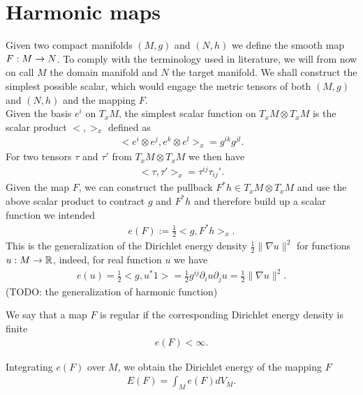 \section{Harmonic maps}
\label{sec:preliminaries}

Given two compact manifolds $(M,g)$ and $(N,h)$ we define the smooth
map $F:M\rightarrow N$. To comply with the terminology used in literature, we
will from now on call $M$ the domain manifold and $N$ the target
manifold. We shall construct the simplest possible scalar,
which would engage the metric tensors of both $(M,g)$ and $(N,h)$ and the mapping $F$.\\
Given the basis $e^i$ on $T_x M$, the simplest scalar function on $T_x
M\otimes T_x M$ is the scalar product $<,>_x$ defined as
\begin{align}
  \label{eq:1}
  <e^i\otimes e^j,e^k\otimes e^l>_x=g^{ik}g^{jl}.
\end{align}
For two tensors $\tau$ and $\tau'$ from $T_x M\otimes T_x M$ we then
have
\begin{align}
  \label{eq:2}
  <\tau,\tau'>_x=\tau^{ij}\tau_{ij}'.
\end{align}
Given the map $F$, we can construct the pullback $F^*h\in T_x M\otimes
T_x M$ and use the above scalar product to contract $g$ and $F^* h$
and therefore build up a scalar function we intended
\begin{align}
  \label{eq:3}
  e(F):=\frac{1}{2}<g,F^*h>_x.
\end{align}
This is the generalization of the Dirichlet energy density
$\frac{1}{2}\lVert\nabla u\rVert^2$ for functions $u:M\rightarrow\mathbb{R}$,
indeed, for real function $u$ we have
\begin{align}
  \label{eq:4}
  e(u)=\frac{1}{2}<g,u^*1>=\frac{1}{2}g^{ij}\partial_i u\partial_j u
  =\frac{1}{2}\lVert\nabla u\rVert^2.
\end{align}
(TODO: the generalization of harmonic function)
\begin{definition}\label{def:regular-map}
  We say that a map $F$ is regular if the corresponding Dirichlet
  energy density is finite
  \begin{align}
    \label{eq:5}
    e(F)<\infty.
  \end{align}
\end{definition}

Integrating $e(F)$ over $M$, we obtain the Dirichlet energy of the
mapping $F$
\begin{align}\label{eq:En_general}
  E(F)=\int_M e(F)dV_M.
\end{align}

